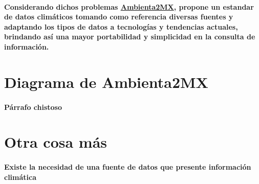     \paragraph{Considerando dichos problemas \underline{Ambienta2MX}, propone un estandar de datos climáticos tomando como referencia diversas fuentes y adaptando los tipos de datos a tecnologías y tendencias actuales, brindando así una mayor portabilidad y simplicidad en la consulta de información.}
  \section{Diagrama de Ambienta2MX}
  
    \paragraph{Párrafo chistoso}
  \section{Otra cosa más}
    \paragraph{Existe la necesidad de una fuente de datos que presente información climática}